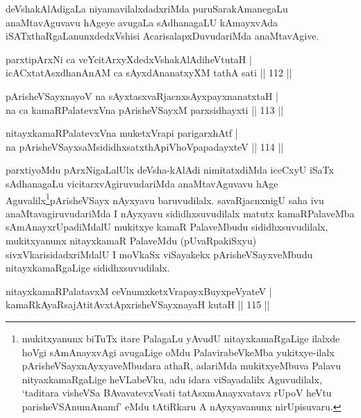 \begin{artha}
deVshakAlAdigaLa niyamavilalxdadxriMda puruSarakAmanegaLu anaMtavAguvavu hAgeye avugaLa sAdhanagaLU kAmayxvAda iSATxthaRgaLanunxdedxVshisi AcarisalapxDuvudariMda anaMtavAgive.
\end{artha}


\begin{shl}
parxtipArxNi ca veYcitArxyXdedxVshakAlAdiheVtutaH |\\
icACxtatAsxdhanAnAM ca sAyxdAnanatxyXM tathA sati \hfill || 112 ||
\end{shl}

\begin{shl}
pArisheVSayxnayoV na sAyxtasxvaRjacnxsAyxpayxnanatxtaH |\\
na ca kamaRPalatevxVna pArisheVSayxM parxsidhayxti \hfill || 113 ||
\end{shl}

\begin{shl}
nitayxkamaRPalatevxVna muketxVrapi parigarxhAtf |\\
na pArisheVSayxsaMsididhxsatxthA\s piVhoVpapadayxteV \hfill || 114 ||
\end{shl}

\begin{artha}
parxtiyoMdu pArxNigaLalUlx deVsha-kAlAdi nimitatxdiMda iceCxyU iSaTx sAdhanagaLu vicitarxvAgiruvudariMda anaMtavAguvavu hAge Aguvalilx\footnote{mukitxyanunx biTuTx itare PalagaLu yAvudU nitayxkamaRgaLige ilalxde hoVgi sAmAnayxvAgi avugaLige oMdu PalavirabeVkeMba yukitxye-ilalx pArisheVSayxnAyxyaveMbudara athaR, adariMda mukitxyeMbuva Palavu nityaxkamaRgaLige heVLabeVku, adu idara viSayadalilx Aguvudilalx, `taditara visheVSa BAvavatevxVsati tatAsxmAnayxvatavx rUpoV heVtu parisheVSAnumAnamf' eMdu tAtiRkaru A nAyxyavanunx nirUpisuvaru.}pArisheVSayx nAyxyavu baruvudilalx. savaRjacnxnigU saha ivu anaMtavagiruvudariMda I nAyxyavu sididhxsuvudilalx matutx kamaRPalaveMba sAmAnayxrUpadiMdalU mukitxye kamaR PalaveMbudu sididhxsuvudilalx, mukitxyanunx nitayxkamaR PalaveMdu (pUvaRpakiSxyu) sivxVkarisidadxriMdalU I moVkaSx viSayakekx pArisheVSayxveMbudu nitayxkamaRgaLige sididhxsuvudilalx.
\end{artha}

\begin{shl}
nitayxkamaRPalatavxM ceVnumxketxVrapayxBuyxpeVyateV |\\
kamaRkAyaRsajAtitAvxtApxrisheVSayxnayaH kutaH \hfill || 115 ||
\end{shl}

